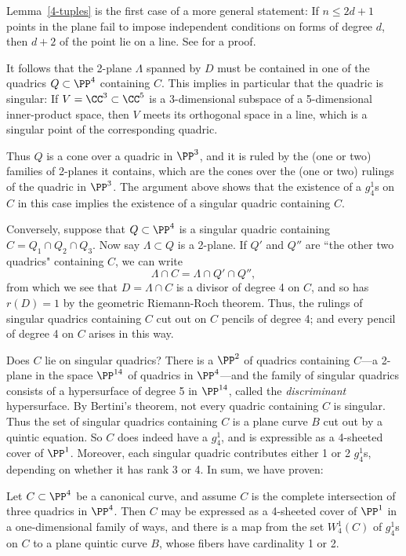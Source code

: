 \begin{fact}
Lemma~\ref{4-tuples} is the first case of a more general statement: If $n\leq 2d+1$ points in the plane fail to impose independent conditions on forms of degree $d$, then $d+2$ of the point lie on a line. See \cite[p. 302]{MR1376653} for a proof.
\end{fact}


 It follows that the 2-plane $\Lambda$ spanned by $D$ must be contained in one of the quadrics $Q \subset \PP^4$ containing $C$. This implies in particular that the quadric is singular: If $V = \CC^3\subset \CC^5$
is a  3-dimensional subspace of a 5-dimensional inner-product space, then $V$ meets its orthogonal space
in a line, which is a singular point of the corresponding quadric.
 
Thus $Q$ is a cone over a quadric in $\PP^3$, and it is ruled by the (one or two) families of 2-planes it contains, which are the cones over the (one or two) rulings of the quadric in $\PP^3$. The argument above shows that the existence of a $g_4^1$s on $C$ in this case implies the existence of a singular quadric containing $C$.

Conversely, suppose that $Q \subset \PP^4$ is a singular quadric containing $C = Q_1 \cap Q_2 \cap Q_3$. Now say $\Lambda \subset Q$ is  a 2-plane. If $Q'$ and $Q''$ are ``the other two quadrics" containing $C$, we can write
$$
\Lambda \cap C = \Lambda \cap Q' \cap Q'', 
$$ 
from which we see that $D = \Lambda \cap C$ is a divisor of degree 4 on $C$, and so has $r(D) = 1$ by the geometric Riemann-Roch theorem. Thus, the rulings of  singular quadrics containing $C$ cut out on $C$ pencils of degree 4; and every pencil of degree 4 on $C$ arises in this way.

Does $C$ lie on singular quadrics? There is a $\PP^2$ of quadrics containing $C$---a 2-plane in the space $\PP^{14}$ of quadrics in $\PP^4$---and the family of singular quadrics  consists of a  hypersurface of degree 5 in $\PP^{14}$, called the \emph{discriminant} hypersurface. By Bertini's theorem, not every quadric containing $C$ is singular. Thus the set of singular quadrics containing $C$ is a plane curve $B$ cut out by a quintic equation. So $C$ does indeed have a $g^1_4$, and is expressible as a 4-sheeted cover of $\PP^1$. Moreover, each singular quadric contributes either 1 or 2 $g^1_4$s, depending on whether it has rank 3 or 4. In sum, we have proven:

\begin{proposition}
Let $C \subset \PP^4$ be a canonical curve, and assume $C$ is the complete intersection of three quadrics in $\PP^4$. Then $C$ may be expressed as a 4-sheeted cover of $\PP^1$ in a one-dimensional family of ways, and there is a map from the set $W^1_4(C)$ of $g^1_4$s on $C$ to a plane quintic curve $B$, whose fibers have cardinality 1 or 2.
\end{proposition}

